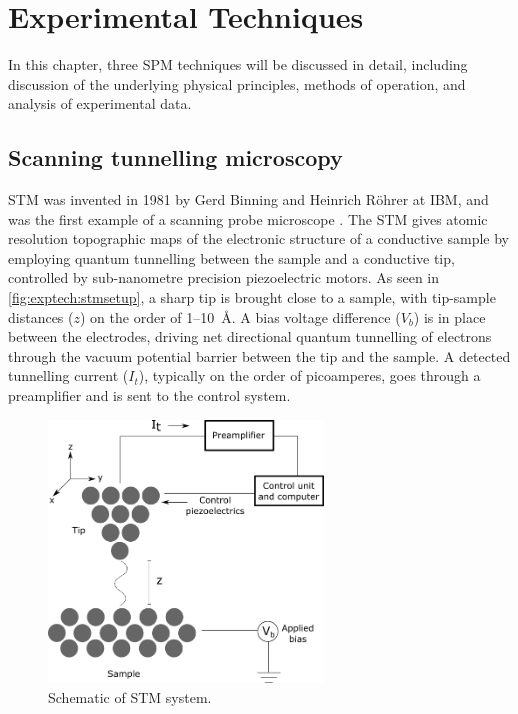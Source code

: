 
\chapter{Experimental Techniques}
\label{ch:exptech}

In this chapter, three \acf{SPM} techniques will be discussed in detail, including discussion of the underlying physical principles, methods of operation, and analysis of experimental data.



\section{Scanning tunnelling microscopy}

\Acf{STM} was invented in 1981 by Gerd Binning and Heinrich R\"ohrer at IBM, and was the first example of a scanning probe microscope \citep{binnig1982surface}. The \ac{STM} gives atomic resolution topographic maps of the electronic structure of a conductive sample by employing quantum tunnelling between the sample and a conductive tip, controlled by sub-nanometre precision piezoelectric motors. As seen in \autoref{fig:exptech:stmsetup}, a sharp tip is brought close to a sample, with tip-sample distances ($z$) on the order of 1--\SI{10}{\angstrom}. A bias voltage difference ($V_b$) is in place between the electrodes, driving net directional quantum tunnelling of electrons through the vacuum potential barrier between the tip and the sample. A detected tunnelling current ($I_t$), typically on the order of picoamperes, goes through a preamplifier and is sent to the control system.

\begin{figure} [h]
    \centering
    \includegraphics[width=0.65\textwidth]{pictures/stm_diagram.png}
    \caption{Schematic of STM system.}
    \label{fig:exptech:stmsetup}
\end{figure}

